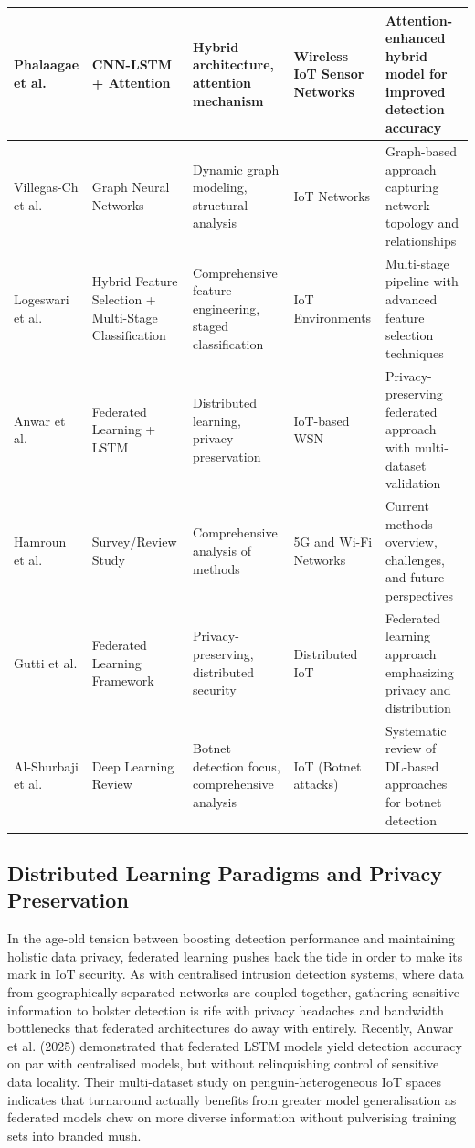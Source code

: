 \documentclass[12pt]{article}
\begin{document}
\begin{longtable}{|p{2.2cm}|p{2.5cm}|p{3cm}|p{2.8cm}|p{3cm}|}
\hline
Phalaagae et al. \cite{Phalaagae202557322} & CNN-LSTM + Attention & Hybrid architecture, attention mechanism & Wireless IoT Sensor Networks & Attention-enhanced hybrid model for improved detection accuracy \\
\hline
Villegas-Ch et al. \cite{Villegas-Ch202565356} & Graph Neural Networks & Dynamic graph modeling, structural analysis & IoT Networks & Graph-based approach capturing network topology and relationships \\
\hline
Logeswari et al. \cite{Logeswari202524970} & Hybrid Feature Selection + Multi-Stage Classification & Comprehensive feature engineering, staged classification & IoT Environments & Multi-stage pipeline with advanced feature selection techniques \\
\hline
Anwar et al. \cite{Anwar20251} & Federated Learning + LSTM & Distributed learning, privacy preservation & IoT-based WSN & Privacy-preserving federated approach with multi-dataset validation \\
\hline
Hamroun et al. \cite{Hamroun202540950} & Survey/Review Study & Comprehensive analysis of methods & 5G and Wi-Fi Networks & Current methods overview, challenges, and future perspectives \\
\hline
Gutti et al. \cite{Gutti2025135863} & Federated Learning Framework & Privacy-preserving, distributed security & Distributed IoT & Federated learning approach emphasizing privacy and distribution \\
\hline
Al-Shurbaji et al. \cite{Al-Shurbaji202511792} & Deep Learning Review & Botnet detection focus, comprehensive analysis & IoT (Botnet attacks) & Systematic review of DL-based approaches for botnet detection \\
\hline
\end{longtable}


\subsection{Distributed Learning Paradigms and Privacy Preservation}

In the age-old tension between boosting detection performance and maintaining holistic data privacy, federated learning pushes back the tide in order to make its mark in IoT security. As with centralised intrusion detection systems, where data from geographically separated networks are coupled together, gathering sensitive information to bolster detection is rife with privacy headaches and bandwidth bottlenecks that federated architectures do away with entirely. Recently, Anwar et al. (2025) demonstrated that federated LSTM models yield detection accuracy on par with centralised models, but without relinquishing control of sensitive data locality. Their multi-dataset study on penguin-heterogeneous IoT spaces indicates that turnaround actually benefits from greater model generalisation as federated models chew on more diverse information without pulverising training sets into branded mush.
\end{document}
